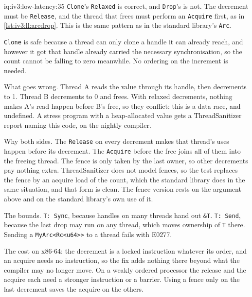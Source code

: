 \begin{solution}{iq:iv3:low-latency:35}
\texttt{Clone}'s \texttt{Relaxed} is correct, and \texttt{Drop}'s is not. The decrement must be \texttt{Release}, and the thread that frees must perform an \texttt{Acquire} first, as in \cref{lst:iv3:ll:arcdrop}. This is the same pattern as in the standard library's \texttt{Arc}.
\label{lst:iv3:ll:arcdrop}

\texttt{Clone} is safe because a thread can only clone a handle it can already reach, and however it got that handle already carried the necessary synchronisation, so the count cannot be falling to zero meanwhile. No ordering on the increment is needed.

What goes wrong. Thread A reads the value through its handle, then decrements to 1. Thread B decrements to 0 and frees. With relaxed decrements, nothing makes A's read happen before B's free, so they conflict: this is a data race, and undefined. A stress program with a heap-allocated value gets a ThreadSanitizer report naming this code, on the nightly compiler.

Why both sides. The \texttt{Release} on every decrement makes that thread's uses happen before its decrement. The \texttt{Acquire} before the free joins all of them into the freeing thread. The fence is only taken by the last owner, so other decrements pay nothing extra. ThreadSanitizer does not model fences, so the test replaces the fence by an acquire load of the count, which the standard library does in the same situation, and that form is clean. The fence version rests on the argument above and on the standard library's own use of it.

The bounds. \texttt{T: Sync}, because handles on many threads hand out \texttt{\&T}. \texttt{T: Send}, because the last drop may run on any thread, which moves ownership of \texttt{T} there. Sending a \texttt{MyArc<Rc<u64>{}>} to a thread fails with E0277.

The cost on x86-64: the decrement is a locked instruction whatever its order, and an acquire needs no instruction, so the fix adds nothing there beyond what the compiler may no longer move. On a weakly ordered processor the release and the acquire each need a stronger instruction or a barrier. Using a fence only on the last decrement saves the acquire on the others.

\end{solution}
